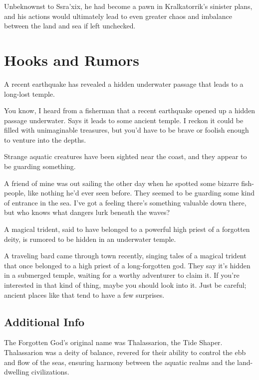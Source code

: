 \documentclass[letterpaper,twocolumn,openany]{dndarticle}
\begin{document}
Unbeknownst to Ssra'xix, he had become a pawn in Kralkatorrik's sinister plans, and his actions would ultimately lead to even greater chaos and imbalance between the land and sea if left unchecked.

\newpage

\section{Hooks and Rumors}
A recent earthquake has revealed a hidden underwater passage that leads to a long-lost temple.
\begin{DndReadAloud}
You know, I heard from a fisherman that a recent earthquake opened up a hidden passage underwater. Says it leads to some ancient temple. I reckon it could be filled with unimaginable treasures, but you'd have to be brave or foolish enough to venture into the depths.
\end{DndReadAloud}

Strange aquatic creatures have been sighted near the coast, and they appear to be guarding something.
\begin{DndReadAloud}
A friend of mine was out sailing the other day when he spotted some bizarre fish-people, like nothing he'd ever seen before. They seemed to be guarding some kind of entrance in the sea. I've got a feeling there's something valuable down there, but who knows what dangers lurk beneath the waves?
\end{DndReadAloud}

A magical trident, said to have belonged to a powerful high priest of a forgotten deity, is rumored to be hidden in an underwater temple.
\begin{DndReadAloud}
A traveling bard came through town recently, singing tales of a magical trident that once belonged to a high priest of a long-forgotten god. They say it's hidden in a submerged temple, waiting for a worthy adventurer to claim it. If you're interested in that kind of thing, maybe you should look into it. Just be careful; ancient places like that tend to have a few surprises.
\end{DndReadAloud}



\subsection{Additional Info}
The Forgotten God's original name was Thalassarion, the Tide Shaper. Thalassarion was a deity of balance, revered for their ability to control the ebb and flow of the seas, ensuring harmony between the aquatic realms and the land-dwelling civilizations.
\end{document}
